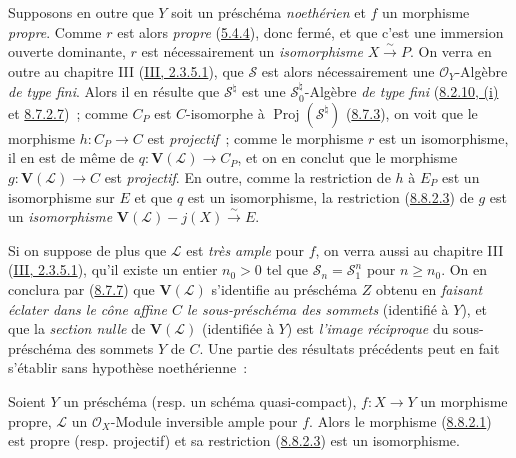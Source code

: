 \begin{remark}[8.8.3]
\label{II.8.8.3-fr}
Supposons en outre que $Y$ soit un préschéma \emph{noethérien} et $f$ un
morphisme \emph{propre}. Comme $r$ est alors \emph{propre}
(\hyperref[II.5.4.4-fr]{5.4.4}), donc fermé, et que c'est une immersion ouverte
dominante, $r$ est nécessairement un \emph{isomorphisme}
$X\xrightarrow{\sim}P$. On verra en outre au chapitre III
(\hyperref[III.2.3.5.1-fr]{III, 2.3.5.1}), que $\mathcal{S}$ est alors
nécessairement une $\mathcal{O}_Y$-Algèbre \emph{de type fini}. Alors il en
résulte que $\mathcal{S}^{\natural}$ est une
$\mathcal{S}_0^{\natural}$-Algèbre \emph{de type fini}
(\hyperref[II.8.2.10-fr]{8.2.10, (i)} et
\hyperref[II.8.7.2.7-fr]{8.7.2.7})~; comme $C_P$ est $C$-isomorphe à
$\operatorname{Proj}(\mathcal{S}^{\natural})$
(\hyperref[II.8.7.3-fr]{8.7.3}), on voit que le morphisme $h:C_P\to C$ est
\emph{projectif}~; comme le morphisme $r$ est un isomorphisme, il en est de
même de $q:\mathbf{V}(\mathcal{L})\to C_P$, et on en conclut que le morphisme
$g:\mathbf{V}(\mathcal{L})\to C$ est \emph{projectif}. En outre, comme la
restriction de $h$ à $E_P$ est un isomorphisme sur $E$ et que $q$ est un
isomorphisme, la restriction (\hyperref[II.8.8.2.3-fr]{8.8.2.3}) de $g$ est un
\emph{isomorphisme}
$\mathbf{V}(\mathcal{L})-j(X)\xrightarrow{\sim}E$.

Si on suppose de plus que $\mathcal{L}$ est \emph{très ample} pour $f$, on
verra aussi au chapitre III (\hyperref[III.2.3.5.1-fr]{III, 2.3.5.1}), qu'il
existe un entier $n_0>0$ tel que
$\mathcal{S}_n=\mathcal{S}_1^n$ pour $n\geqslant n_0$. On en conclura par
(\hyperref[II.8.7.7-fr]{8.7.7}) que $\mathbf{V}(\mathcal{L})$ s'identifie au
préschéma $Z$ obtenu en \emph{faisant éclater dans le cône affine $C$ le
sous-préschéma des sommets} (identifié à $Y$), et que la \emph{section nulle}
de $\mathbf{V}(\mathcal{L})$ (identifiée à $Y$) est \emph{l'image réciproque}
du sous-préschéma des sommets $Y$ de $C$. Une partie des résultats précédents
peut en fait s'établir sans hypothèse noethérienne~:
\end{remark}

\begin{corollary}[8.8.4]
\label{II.8.8.4-fr}
Soient $Y$ un préschéma (resp. un schéma quasi-compact), $f:X\to Y$ un
morphisme propre, $\mathcal{L}$ un $\mathcal{O}_X$-Module inversible ample pour
$f$. Alors le morphisme (\hyperref[II.8.8.2.1-fr]{8.8.2.1}) est propre (resp.
projectif) et sa restriction (\hyperref[II.8.8.2.3-fr]{8.8.2.3}) est un
isomorphisme.
\end{corollary}

